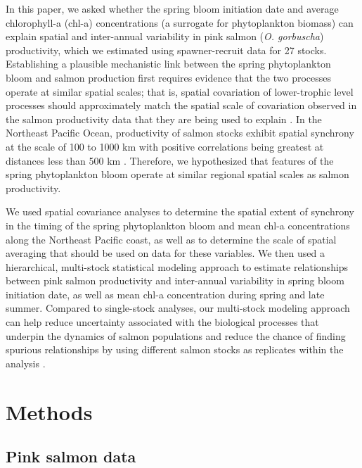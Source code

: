 In this paper, we asked whether the spring bloom initiation date and average
chlorophyll-a (chl-a) concentrations (a surrogate for phytoplankton biomass) can
explain spatial and inter-annual variability in pink salmon (\emph{O.
gorbuscha}) productivity, which we estimated using spawner-recruit data for 27
stocks. Establishing a plausible mechanistic link between the spring
phytoplankton bloom and salmon production first requires evidence that the two
processes operate at similar spatial scales; that is, spatial covariation of
lower-trophic level processes should approximately match the spatial scale of
covariation observed in the salmon productivity data that they are being used to
explain \citep{Bjornstad1999a, Koenig1999a}. In the Northeast Pacific Ocean,
productivity of salmon stocks exhibit spatial synchrony at the scale of 100 to
1000 km \citep{Mueter2002b} with positive correlations being greatest at
distances less than 500 km \citep{Pyper2005a}. Therefore, we hypothesized that
features of the spring phytoplankton bloom operate at similar regional spatial
scales as salmon productivity.

We used spatial covariance analyses to determine the spatial extent of synchrony
in the timing of the spring phytoplankton bloom and mean chl-a concentrations
along the Northeast Pacific coast, as well as to determine the scale of spatial
averaging that should be used on data for these variables. We then used a
hierarchical, multi-stock statistical modeling approach to estimate
relationships between pink salmon productivity and inter-annual variability in
spring bloom initiation date, as well as mean chl-a concentration during spring
and late summer.  Compared to single-stock analyses, our multi-stock modeling
approach can help reduce uncertainty associated with the biological processes
that underpin the dynamics of salmon populations and reduce the chance of
finding spurious relationships by using different salmon stocks as replicates
within the analysis \citep{Myers1998c, Myers1999a}.



\section{Methods}

\subsection{Pink salmon data}

